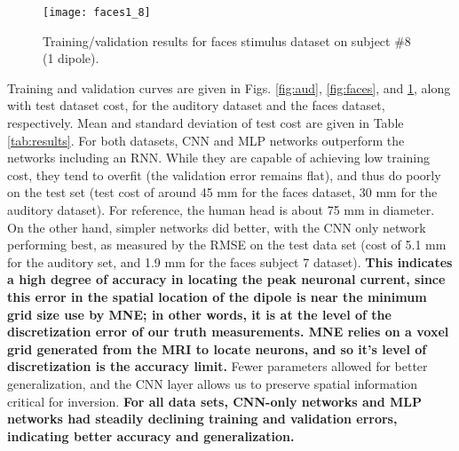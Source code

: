 \documentclass[journal,12pt,onecolumn,draftclsnofoot,]{IEEEtran}
\begin{document}
\begin{figure}[h!]
\centering
\texttt{[image: faces1\_8]}
\caption{Training/validation results for faces stimulus dataset on subject \#8 (1 dipole).}
\label{fig:faces_8}
\end{figure}

Training and validation curves are given in Figs. \ref{fig:aud}, \ref{fig:faces}, and \ref{fig:faces_8}, along with test dataset cost, for the auditory dataset and the faces dataset, respectively. Mean and standard deviation of test cost are given in Table \ref{tab:results}. For both datasets, CNN and MLP networks outperform the networks including an RNN. While they are capable of achieving low training cost, they tend to overfit (the validation error remains flat), and thus do poorly on the test set (test cost of around 45 mm for the faces dataset, 30 mm for the auditory dataset). For reference, the human head is about 75 mm in diameter. On the other hand, simpler networks did better, with the CNN only network performing best, as measured by the RMSE on the test data set (cost of 5.1 mm for the auditory set, and 1.9 mm for the faces subject 7 dataset). \textbf{This indicates a high degree of accuracy in locating the peak neuronal current, since this error in the spatial location of the dipole is near the minimum grid size use by MNE; in other words, it is at the level of the discretization error of our truth measurements. MNE relies on a voxel grid generated from the MRI to locate neurons, and so it's level of discretization is the accuracy limit.} Fewer parameters allowed for better generalization, and the CNN layer allows us to preserve spatial information critical for inversion. \textbf{For all data sets, CNN-only networks and MLP networks had steadily declining training and validation errors, indicating better accuracy and generalization.}
\end{document}
